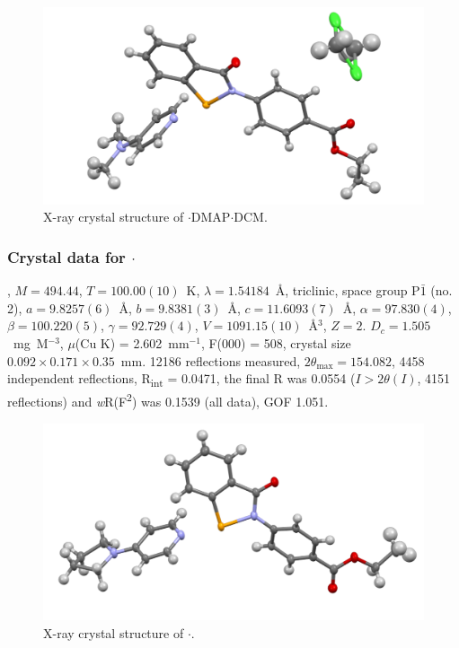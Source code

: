 \begin{refsection}
\begin{figure}
  \includegraphics[width=0.6\linewidth]{Figures/ebs-4co2et-dmap-dcm-xtal.pdf}
  \caption{X-ray crystal structure of \texorpdfstring{$ \cdot $DMAP$ \cdot $DCM}{C24 H25 Cl N3 O3 Se}.}
\end{figure}

\subsubsection{Crystal data for \texorpdfstring{$ \cdot $}{C25 H25 N3 O3 Se}}
, $M=494.44$, $T=100.00(10)$~K, $\lambda=1.54184$~\AA, triclinic, space group P$\bar{1}$ (no. 2), $a = 9.8257(6)$~\AA, $b = 9.8381(3)$~\AA, $c = 11.6093(7)$~\AA, $\alpha = 97.830(4)$\degree, $\beta = 100.220(5)$\degree, $\gamma = 92.729(4)$\degree, $V = 1091.15(10)$~\AA$^{3}$, $Z = 2$. $D_{c}= 1.505$~mg~M$^{-3}$, $\mu$(Cu K\a) = 2.602~mm$^{-1}$, F(000) = 508, crystal size $0.092 \times 0.171 \times 0.35$~mm. 12186 reflections measured, $2\theta_{\max}=154.082$\degree, 4458 independent reflections, R\textsubscript{int} = 0.0471, the final R was 0.0554 ($I > 2\theta(I)$, 4151 reflections) and \textit{w}R(F\textsuperscript{2}) was 0.1539 (all data), GOF 1.051.

\begin{figure}
  \includegraphics[width=0.6\linewidth]{Figures/ebs-4co2et-pyrrol-xtal.pdf}
  \caption{X-ray crystal structure of \texorpdfstring{$ \cdot $}{C25 H25 N3 O3 Se}.}
\end{figure}


\end{refsection}
